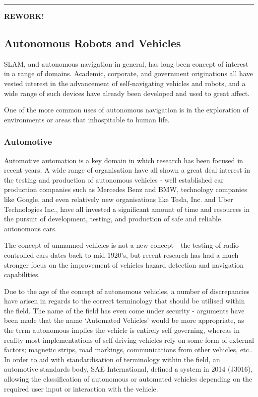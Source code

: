 \pagebreak

\noindent\rule{\textwidth}{1pt}
{\bf REWORK!}
\subsection{Autonomous Robots and Vehicles}
SLAM, and autonomous navigation in general, has long been concept of interest
in a range of domains.
Academic, corporate, and government originations all have vested interest in
the advancement of self-navigating vehicles and robots, and a wide range of
such devices have already been developed and used to great affect.

One of the more common uses of autonomous navigation is in the exploration of
environments or areas that inhospitable to human life.

\subsubsection{Automotive}
Automotive automation is a key domain in which research has been focused in
recent years.
A wide range of organisation have all shown a great deal interest in the testing
and production of autonomous vehicles - well established car production companies
such as Mercedes Benz and BMW, technology companies like Google, and even
relatively new organisations like Tesla, Inc. and Uber Technologies Inc., have
all invested a significant amount of time and resources in the pursuit of
development, testing, and production of safe and reliable autonomous cars.

The concept of unmanned vehicles is not a new concept - the testing of radio
controlled cars dates back to mid 1920's, but recent research has had a much
stronger focus on the improvement of vehicles hazard detection and navigation
capabilities.

Due to the age of the concept of autonomous vehicles, a number of discrepancies
have arisen in regards to the correct terminology that should be utilised
within the field.
The name of the field has even come under security - arguments have been made
that the name `Automated Vehicles' would be more appropriate, as the term
autonomous implies the vehicle is entirely self governing, whereas in
reality most implementations of self-driving vehicles rely on some form of
external factors; magnetic strips, road markings, communications from other
vehicles, etc..
In order to aid with standardisation of terminology within the field, an
automotive standards body, SAE International, defined a system in 2014
(J3016), allowing the classification of autonomous or automated vehicles
depending on the required user input or interaction with the vehicle.


